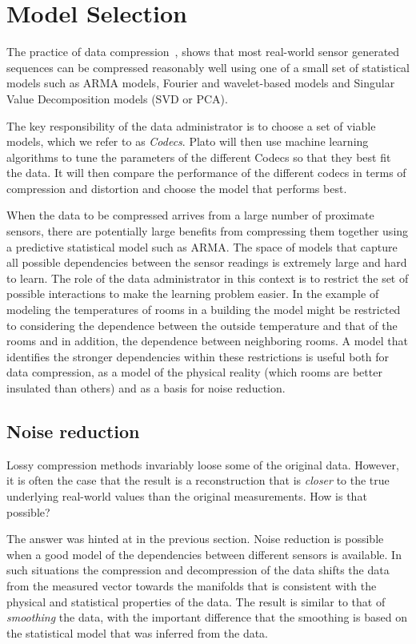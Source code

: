 \section{Model Selection}
\label{sec:Model Selection}
The practice of data compression~\cite{Sayood12}, shows that most
real-world sensor generated sequences can be compressed reasonably
well using one of a small set of statistical models such as ARMA
models, Fourier and wavelet-based models and Singular Value
Decomposition models (SVD or PCA). 

The key responsibility of the data administrator is to choose a set of
viable models, which we refer to as {\em Codecs}. Plato will then use
machine learning algorithms to tune the parameters of the different
Codecs so that they best fit the data. It will then compare the
performance of the different codecs in terms of compression and
distortion and choose the model that performs best.

When the data to be compressed arrives from a large number of
proximate sensors, there are potentially large benefits from
compressing them together using a predictive statistical model such as
ARMA. The space of models that capture all possible dependencies
between the sensor readings is extremely large and hard to learn. The
role of the data administrator in this context is to restrict the set
of possible interactions to make the learning problem easier. In the
example of modeling the temperatures of rooms in a building the model
might be restricted to considering the dependence between the outside
temperature and that of the rooms and in addition, the dependence
between neighboring rooms. A model that identifies the stronger
dependencies within these restrictions is useful both for data
compression, as a model of the physical reality (which rooms are
better insulated than others) and as a basis for noise reduction.

\subsection{Noise reduction}
Lossy compression methods invariably loose some of the original
data. However, it is often the case that the result is a
reconstruction that is {\em closer} to the true underlying real-world
values than the original measurements. How is that possible?

The answer was hinted at in the previous section. Noise reduction is
possible when a good model of the dependencies between different
sensors is available. In such situations the compression and
decompression of the data shifts the data from the measured vector
towards the manifolds that is consistent with the physical and
statistical properties of the data. The result is similar to that of
{\em smoothing} the data, with the important difference that the
smoothing is based on the statistical model that was inferred from the data.


